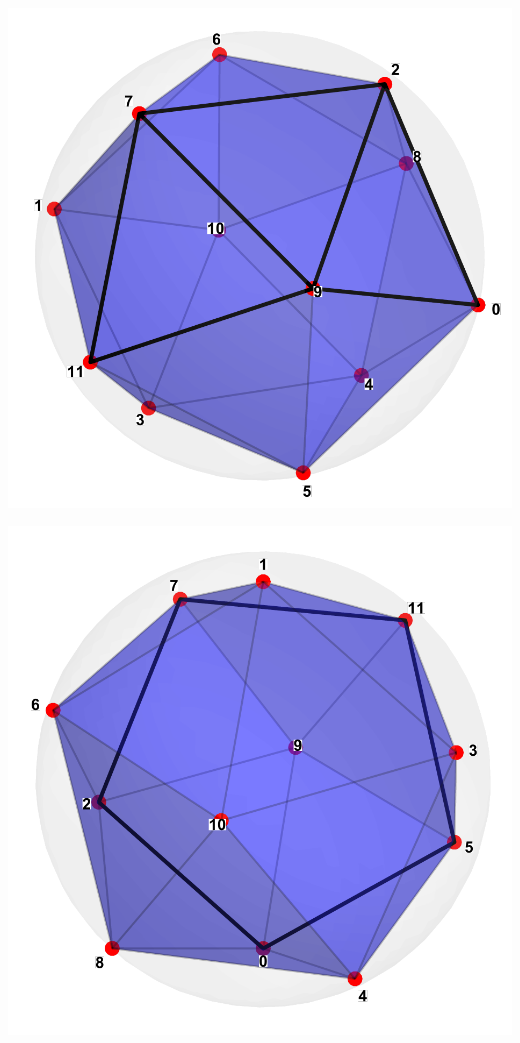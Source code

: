 \documentclass[11pt,a4paper]{article}
\begin{document}
\begin{center}
  \begin{minipage}[c]{0.45\linewidth}
    \includegraphics[width=\linewidth]{icosahedron}
  \end{minipage}\hfill
  \begin{minipage}[c]{0.45\linewidth}
    \includegraphics[width=\linewidth]{icosahedronp}
  \end{minipage}
\end{center}
\end{document}
